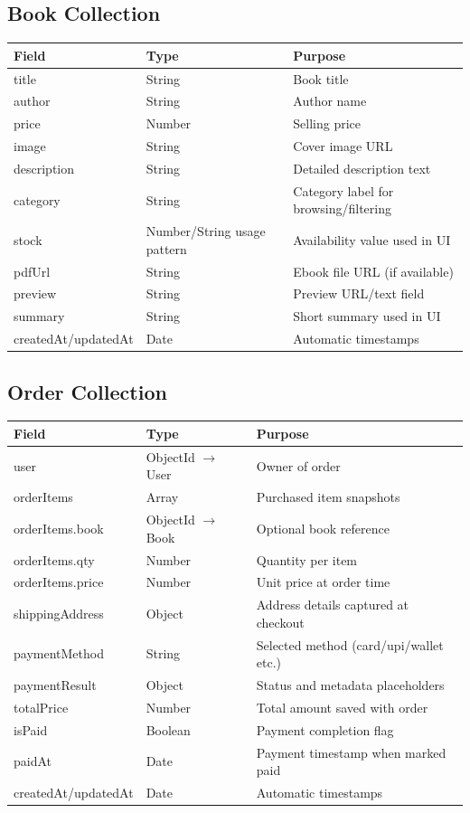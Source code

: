 \documentclass[12pt,a4paper]{report}
\begin{document}
\subsection*{Book Collection}
\begin{longtable}{>{\raggedright\arraybackslash}p{} >{\raggedright\arraybackslash}p{} >{\raggedright\arraybackslash}p{}}
\toprule
\textbf{Field} & \textbf{Type} & \textbf{Purpose} \\
\midrule
title & String & Book title \\
author & String & Author name \\
price & Number & Selling price \\
image & String & Cover image URL \\
description & String & Detailed description text \\
category & String & Category label for browsing/filtering \\
stock & Number/String usage pattern & Availability value used in UI \\
pdfUrl & String & Ebook file URL (if available) \\
preview & String & Preview URL/text field \\
summary & String & Short summary used in UI \\
createdAt/updatedAt & Date & Automatic timestamps \\
\bottomrule
\end{longtable}

\subsection*{Order Collection}
\begin{longtable}{>{\raggedright\arraybackslash}p{} >{\raggedright\arraybackslash}p{} >{\raggedright\arraybackslash}p{}}
\toprule
\textbf{Field} & \textbf{Type} & \textbf{Purpose} \\
\midrule
user & ObjectId $\rightarrow$ User & Owner of order \\
orderItems & Array & Purchased item snapshots \\
orderItems.book & ObjectId $\rightarrow$ Book & Optional book reference \\
orderItems.qty & Number & Quantity per item \\
orderItems.price & Number & Unit price at order time \\
shippingAddress & Object & Address details captured at checkout \\
paymentMethod & String & Selected method (card/upi/wallet etc.) \\
paymentResult & Object & Status and metadata placeholders \\
totalPrice & Number & Total amount saved with order \\
isPaid & Boolean & Payment completion flag \\
paidAt & Date & Payment timestamp when marked paid \\
createdAt/updatedAt & Date & Automatic timestamps \\
\bottomrule
\end{longtable}
\end{document}
